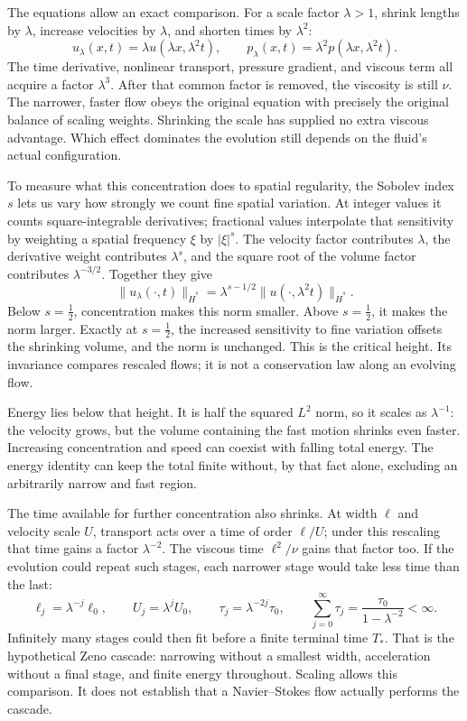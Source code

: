 The equations allow an exact comparison. For a scale factor \(\lambda>1\),
shrink lengths by \(\lambda\), increase velocities by \(\lambda\), and
shorten times by \(\lambda^2\):
\[
 u_\lambda(x,t)=\lambda u(\lambda x,\lambda^2t),
 \qquad
 p_\lambda(x,t)=\lambda^2p(\lambda x,\lambda^2t).
\]
The time derivative, nonlinear transport, pressure gradient, and viscous
term all acquire a factor \(\lambda^3\). After that common factor is
removed, the viscosity is still \(\nu\). The narrower, faster flow obeys
the original equation with precisely the original balance of scaling
weights. Shrinking the scale has supplied no extra viscous advantage.
Which effect dominates the evolution still depends on the fluid's actual
configuration.

To measure what this concentration does to spatial regularity, the Sobolev
index \(s\) lets us vary how strongly we count fine spatial variation.
At integer values it counts square-integrable derivatives; fractional values
interpolate that sensitivity by weighting a spatial frequency \(\xi\) by
\(\lvert\xi\rvert^s\). The velocity factor contributes \(\lambda\), the
derivative weight contributes \(\lambda^s\), and the square root of the
volume factor contributes \(\lambda^{-3/2}\). Together they give
\[
 \|u_\lambda(\cdot,t)\|_{\dot H^s}
 =\lambda^{s-1/2}\|u(\cdot,\lambda^2t)\|_{\dot H^s}.
\]
Below \(s=\tfrac12\), concentration makes this norm smaller. Above
\(s=\tfrac12\), it makes the norm larger. Exactly at \(s=\tfrac12\),
the increased sensitivity to fine variation offsets the shrinking volume,
and the norm is unchanged. This is the critical height. Its invariance
compares rescaled flows; it is not a conservation law along an evolving flow.

Energy lies below that height. It is half the squared \(L^2\) norm, so it
scales as \(\lambda^{-1}\): the velocity grows, but the volume containing the fast
motion shrinks even faster. Increasing concentration and speed can coexist
with falling total energy. The energy identity can keep the total finite
without, by that fact alone, excluding an arbitrarily narrow and fast region.

The time available for further concentration also shrinks. At width
\(\ell\) and velocity scale \(U\), transport acts over a time of order
\(\ell/U\); under this rescaling that time gains a factor
\(\lambda^{-2}\). The viscous time \(\ell^2/\nu\) gains that factor too.
If the evolution could repeat such stages, each narrower stage would take
less time than the last:
\[
 \ell_j=\lambda^{-j}\ell_0,
 \qquad U_j=\lambda^jU_0,
 \qquad \tau_j=\lambda^{-2j}\tau_0,
 \qquad
 \sum_{j=0}^{\infty}\tau_j
 =\frac{\tau_0}{1-\lambda^{-2}}<\infty.
\]
Infinitely many stages could then fit before a finite terminal time \(T_*\). That
is the hypothetical Zeno cascade: narrowing without a smallest width,
acceleration without a final stage, and finite energy throughout. Scaling
allows this comparison. It does not establish that a Navier--Stokes flow
actually performs the cascade.

